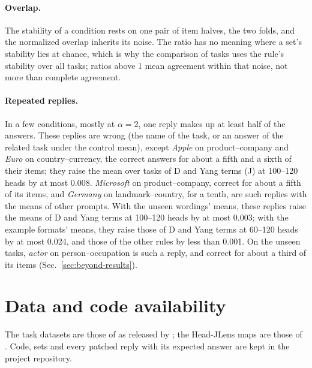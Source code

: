 \documentclass[10pt,a4paper]{article}
\begin{document}
\paragraph{Overlap.} The stability of a condition rests on one pair of item halves, the two folds, and the normalized overlap inherits its noise. The ratio has no meaning where a set's stability lies at chance, which is why the comparison of tasks uses the rule's stability over all tasks; ratios above 1 mean agreement within that noise, not more than complete agreement.

\paragraph{Repeated replies.} In a few conditions, mostly at $\alpha=2$, one reply makes up at least half of the answers. These replies are wrong (the name of the task, or an answer of the related task under the control mean), except \emph{Apple} on product--company and \emph{Euro} on country--currency, the correct answers for about a fifth and a sixth of their items; they raise the mean over tasks of D and Yang terms (J) at 100--120 heads by at most 0.008. \emph{Microsoft} on product--company, correct for about a fifth of its items, and \emph{Germany} on landmark--country, for a tenth, are such replies with the means of other prompts. With the unseen wordings' means, these replies raise the means of D and Yang terms at 100--120 heads by at most 0.003; with the example formats' means, they raise those of D and Yang terms at 60--120 heads by at most 0.024, and those of the other rules by less than 0.001. On the unseen tasks, \emph{actor} on person--occupation is such a reply, and correct for about a third of its items (Sec.~\ref{sec:beyond-results}).

\section*{Data and code availability}

The task datasets are those of \citet{todd2024function} as released by \citet{yang2026shared}; the Head-JLens maps are those of \citet{merlo2026headjlens}. Code, sets and every patched reply with its expected answer are kept in the project repository.




\clearpage
\appendix
\end{document}
